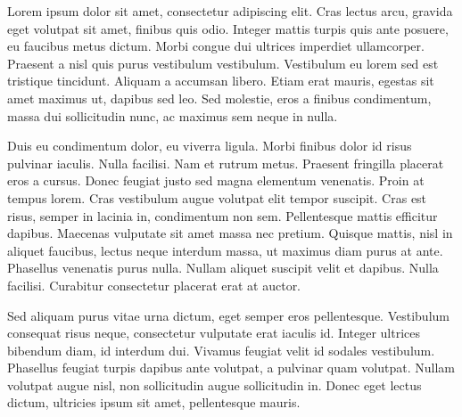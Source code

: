 
Lorem ipsum dolor sit amet, consectetur adipiscing elit. Cras lectus arcu, gravida eget volutpat sit amet, finibus quis odio. Integer mattis turpis quis ante posuere, eu faucibus metus dictum. Morbi congue dui ultrices imperdiet ullamcorper. Praesent a nisl quis purus vestibulum vestibulum. Vestibulum eu lorem sed est tristique tincidunt. Aliquam a accumsan libero. Etiam erat mauris, egestas sit amet maximus ut, dapibus sed leo. Sed molestie, eros a finibus condimentum, massa dui sollicitudin nunc, ac maximus sem neque in nulla.

Duis eu condimentum dolor, eu viverra ligula. Morbi finibus dolor id risus pulvinar iaculis. Nulla facilisi. Nam et rutrum metus. Praesent fringilla placerat eros a cursus. Donec feugiat justo sed magna elementum venenatis. Proin at tempus lorem. Cras vestibulum augue volutpat elit tempor suscipit. Cras est risus, semper in lacinia in, condimentum non sem. Pellentesque mattis efficitur dapibus. Maecenas vulputate sit amet massa nec pretium. Quisque mattis, nisl in aliquet faucibus, lectus neque interdum massa, ut maximus diam purus at ante. Phasellus venenatis purus nulla. Nullam aliquet suscipit velit et dapibus. Nulla facilisi. Curabitur consectetur placerat erat at auctor.

Sed aliquam purus vitae urna dictum, eget semper eros pellentesque. Vestibulum consequat risus neque, consectetur vulputate erat iaculis id. Integer ultrices bibendum diam, id interdum dui. Vivamus feugiat velit id sodales vestibulum. Phasellus feugiat turpis dapibus ante volutpat, a pulvinar quam volutpat. Nullam volutpat augue nisl, non sollicitudin augue sollicitudin in. Donec eget lectus dictum, ultricies ipsum sit amet, pellentesque mauris.
